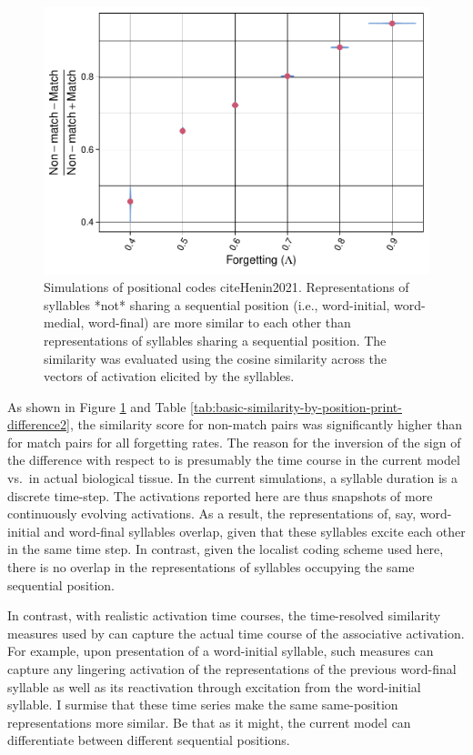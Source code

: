 \documentclass[
]{article}
\begin{document}
\begin{figure}
\includegraphics[width=1\linewidth]{tp_model_entrainment_files/figure-latex/basic-similarity-by-position-plot-difference-1} \caption{Simulations of positional codes cite{Henin2021}. Representations of syllables *not* sharing a sequential position (i.e., word-initial, word-medial, word-final) are more similar to each other than representations of syllables sharing a sequential position. The similarity was evaluated using the cosine similarity across the vectors of activation elicited by the syllables.}\label{fig:basic-similarity-by-position-plot-difference}
\end{figure}

As shown in Figure
\ref{fig:basic-similarity-by-position-plot-difference} and Table
\ref{tab:basic-similarity-by-position-print-difference2}, the similarity
score for non-match pairs was significantly higher than for match pairs
for all forgetting rates. The reason for the inversion of the sign of
the difference with respect to \citep{Henin2021} is presumably the time
course in the current model vs.~in actual biological tissue. In the
current simulations, a syllable duration is a discrete time-step. The
activations reported here are thus snapshots of more continuously
evolving activations. As a result, the representations of, say,
word-initial and word-final syllables overlap, given that these
syllables excite each other in the same time step. In contrast, given
the localist coding scheme used here, there is no overlap in the
representations of syllables occupying the same sequential position.

In contrast, with realistic activation time courses, the time-resolved
similarity measures used by \citep{Henin2021} can capture the actual
time course of the associative activation. For example, upon
presentation of a word-initial syllable, such measures can capture any
lingering activation of the representations of the previous word-final
syllable as well as its reactivation through excitation from the
word-initial syllable. I surmise that these time series make the same
same-position representations more similar. Be that as it might, the
current model can differentiate between different sequential positions.
\end{document}
